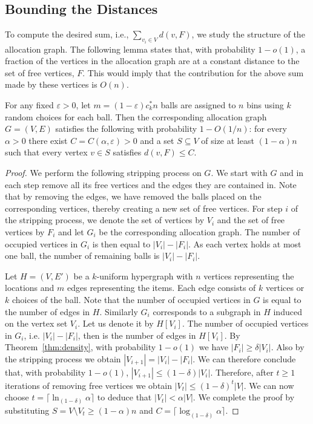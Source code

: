 \subsection{Bounding the Distances }
To compute the desired sum, i.e., $\sum_{v_i\in V}d(v,F)$, we study the structure of the allocation graph. The following lemma states that, with probability $1-o(1)$, a fraction of the vertices in the allocation graph are at a constant distance to the set of free vertices, $F$. This would imply that the contribution for the above sum made by these vertices is $O(n)$. 

\begin{lemma}\label{lem:dist}
For any fixed $\varepsilon>0$, let $m=(1-\varepsilon) c_k^* n$ balls are assigned to $n$ bins using $k$ random choices for each ball. Then the corresponding allocation graph $G=(V,E)$ satisfies the following with probability $1-O(1/n)$: for every $\alpha >0$ there exist $C=C(\alpha, \varepsilon) >0$ and a set $S \subseteq V$ of size at least $(1-\alpha)n$ such that every vertex $v\in S$ satisfies $d(v,F)\le C$. \end{lemma}

\begin{proof}
We perform the following stripping process on $G$.
We start with $G$ and in each step remove all its free vertices and the edges they are contained in. Note that by removing the edges, we have removed the balls placed on the corresponding vertices, thereby creating a new set of free vertices. For step $i$ of the stripping process, we denote the set of vertices by $V_i$ and the set of free vertices by $F_i$ and let $G_i$ be the corresponding allocation graph. The number of occupied vertices in $G_i$ is then equal to $|V_i|-|F_i|$. As each vertex holds at most one ball, the number of remaining balls is $|V_i|-|F_i|$.

Let $H=(V,E')$ be a $k$-uniform hypergraph with $n$ vertices representing the locations and $m$ edges representing the items. Each edge consists of $k$ vertices or $k$ choices of the ball.
Note that the number of occupied vertices in $G$ is equal to the number of edges in $H$. Similarly $G_i$ corresponds to a subgraph in $H$ induced on the vertex set $V_i$. Let us denote it by $H[V_i]$. 
The number of occupied vertices in $G_i$, i.e. $|V_{i}|-|F_{i}|$, then is the number of edges in $H[V_i]$. By Theorem~\ref{thm:density}, with probability $1-o(1)$ we have $|F_{i}|\ge \delta |V_{i}|$.  Also by the stripping process we obtain $|V_{i+1}| = |V_{i}|- |F_{i}| $. We can therefore conclude that, with probability $1-o(1)$,  $|V_{i+1}| \le (1-\delta) |V_{i}|$.
Therefore, after $t\ge 1$ iterations of removing free vertices we obtain  $|V_{t}|\le (1-\delta )^{t}|V|$. We can now choose $t=\lceil{\ln_{(1-\delta)}\alpha}\rceil$ to deduce that $ |V_{t}| <\alpha |V|$. We complete the proof by substituting $S= V\setminus V_t \ge (1-\alpha) n$ and $C= \lceil{\log_{(1-\delta)} \alpha}\rceil$.
\end{proof}


